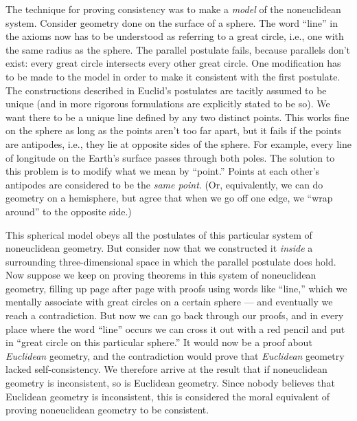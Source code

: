 The technique for proving consistency was to make a \emph{model} of the noneuclidean
system. Consider geometry done on the surface of a sphere. The word ``line'' in the axioms now
has to be understood as referring to a great circle, i.e., one with the same radius as the sphere.
The parallel postulate fails, because parallels don't exist: every great circle intersects every other great circle.
One modification has to be made to the model in order to make it consistent with the first postulate.
The constructions described in Euclid's postulates are tacitly assumed to be unique (and in more
rigorous formulations are explicitly stated to be so). We want there to be a unique line defined by
any two distinct points. This works fine on the sphere as long as the points aren't too far apart, but
it fails if the points are antipodes, i.e., they lie at opposite sides of the sphere. For example, every line of longitude on the
Earth's surface passes through both poles.
The solution to this problem is to modify what we mean by ``point.'' Points at each
other's antipodes are considered to be the \emph{same point}. (Or, equivalently, we can do geometry on
a hemisphere, but agree that when we go off one edge, we ``wrap around'' to the opposite side.)

This spherical model obeys all the postulates of this particular system of noneuclidean
geometry. But consider now that we constructed it \emph{inside} a surrounding three-dimensional
space in which the parallel postulate does hold. Now suppose we keep on proving theorems in this
system of noneuclidean geometry, filling up page after page with proofs using words like ``line,''
which we mentally associate with great circles on a certain sphere --- and eventually we reach a
contradiction. But now we can go back through our proofs, and in every place where the word
``line'' occurs we can cross it out with a red pencil and put in ``great circle on this particular
sphere.'' It would now be a proof about \emph{Euclidean} geometry, and the contradiction would
prove that \emph{Euclidean} geometry lacked self-consistency. We therefore arrive at the result
that if noneuclidean geometry is inconsistent, so is Euclidean geometry. Since nobody believes
that Euclidean geometry is inconsistent, this is considered the moral equivalent of proving
noneuclidean geometry to be consistent.

